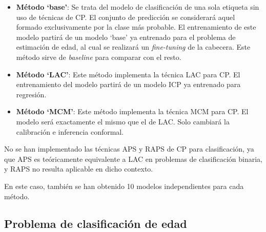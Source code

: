 \begin{itemize}

    \item \textbf{Método `base'}: Se trata del modelo de clasificación de una sola etiqueta sin uso de técnicas de \acrshort{CP}. El conjunto de predicción se considerará aquel formado exclusivamente por la clase más probable. El entrenamiento de este modelo partirá de un modelo `base' ya entrenado para el problema de estimación de edad, al cual se realizará un \textit{fine-tuning} de la cabecera. Este método sirve de \textit{baseline} para comparar con el resto. 

    \item \textbf{Método `LAC'}: Este método implementa la técnica \acrshort{LAC} para \acrshort{CP}. El entrenamiento del modelo partirá de un modelo \acrshort{ICP} ya entrenado para regresión.

    \item \textbf{Método `MCM'}: Este método implementa la técnica MCM para CP. El modelo será exactamente el mismo que el de \acrshort{LAC}. Solo cambiará la calibración e inferencia conformal. 

\end{itemize} 

No se han implementado las técnicas \acrshort{APS} y \acrshort{RAPS} de \acrshort{CP} para clasificación, ya que \acrshort{APS} es teóricamente equivalente a \acrshort{LAC} en problemas de clasificación binaria, y \acrshort{RAPS} no resulta aplicable en dicho contexto.

En este caso, también se han obtenido 10 modelos independientes para cada método. 


\subsection{Problema de clasificación de edad}




